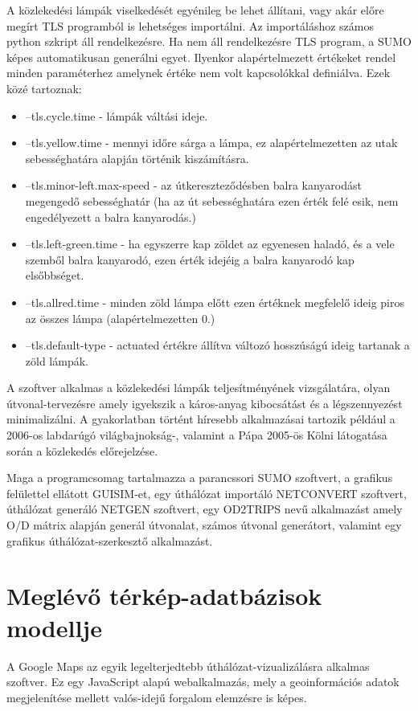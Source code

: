 A közlekedési lámpák viselkedését egyénileg be lehet állítani, vagy akár előre
megírt TLS programból is lehetséges importálni. Az importáláshoz számos python szkript áll rendelkezésre. Ha nem áll rendelkezésre TLS program, a SUMO képes automatikusan generálni
egyet. Ilyenkor alapértelmezett értékeket rendel minden paraméterhez amelynek értéke nem volt kapcsolókkal definiálva. Ezek közé tartoznak:
\begin{itemize}
\item --tls.cycle.time - lámpák váltási ideje.
\item --tls.yellow.time - mennyi időre sárga a lámpa, ez alapértelmezetten az utak sebességhatára alapján történik kiszámításra.
\item --tls.minor-left.max-speed - az útkereszteződésben balra kanyarodást megengedő sebességhatár (ha az út sebességhatára ezen érték felé esik, nem engedélyezett a balra kanyarodás.)
\item --tls.left-green.time - ha egyszerre kap zöldet az egyenesen haladó, és a vele szemből balra kanyarodó, ezen érték idejéig a balra kanyarodó kap elsőbbséget.
\item --tls.allred.time - minden zöld lámpa előtt ezen értéknek megfelelő ideig piros az összes lámpa (alapértelmezetten 0.)
\item --tls.default-type - actuated értékre állítva változó hosszúságú ideig tartanak a zöld lámpák.
\end{itemize}

A szoftver alkalmas a közlekedési lámpák teljesítményének vizsgálatára, olyan útvonal-tervezésre amely igyekszik a káros-anyag kibocsátást és a légszennyezést
minimalizálni. A gyakorlatban történt híresebb alkalmazásai tartozik például a 2006-os labdarúgó világbajnokság-, valamint a Pápa 2005-ös Kölni látogatása során a közlekedés előrejelzése.

Maga a programcsomag tartalmazza a parancssori SUMO szoftvert, a grafikus felülettel ellátott GUISIM-et, egy úthálózat importáló NETCONVERT szoftvert, úthálózat generáló NETGEN szoftvert, 
egy OD2TRIPS nevű alkalmazást amely O/D mátrix alapján generál útvonalat, számos útvonal generátort, valamint egy grafikus úthálózat-szerkesztő alkalmazást.
\section{Meglévő térkép-adatbázisok modellje}

A Google Maps az egyik legelterjedtebb úthálózat-vizualizálásra alkalmas szoftver. Ez egy JavaScript alapú webalkalmazás, mely a geoinformációs adatok megjelenítése
mellett valós-idejű forgalom elemzésre is képes. 

